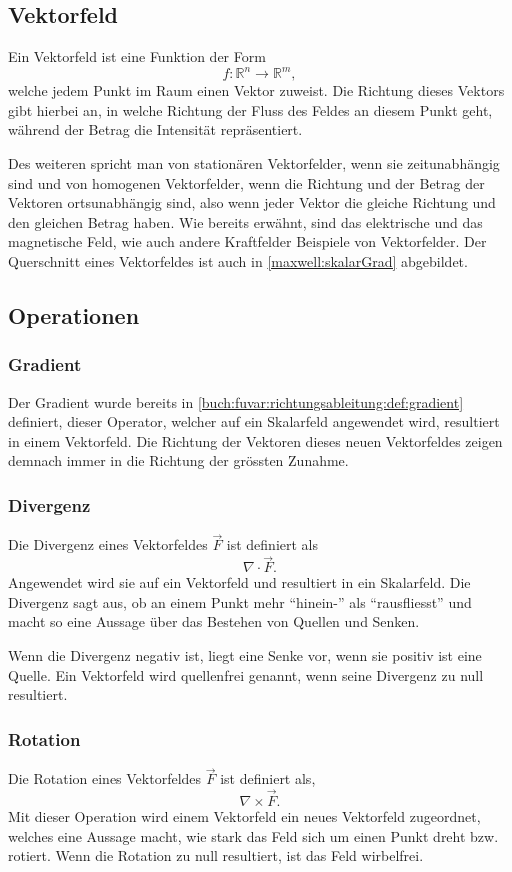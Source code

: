 \subsection{Vektorfeld\label{maxwell:vektorfeld}}

Ein Vektorfeld ist eine Funktion der Form \[ f: \mathbb{R}^n \rightarrow \mathbb{R}^m, \] welche jedem Punkt im Raum einen Vektor zuweist. 
Die Richtung dieses Vektors gibt hierbei an, in welche Richtung der Fluss des Feldes an diesem Punkt geht, während der Betrag die Intensität repräsentiert.


Des weiteren spricht man von stationären Vektorfelder, wenn sie zeitunabhängig sind und von homogenen Vektorfelder, wenn die Richtung und der Betrag der Vektoren ortsunabhängig sind, also wenn jeder Vektor die gleiche Richtung und den gleichen Betrag haben. 
Wie bereits erwähnt, sind das elektrische und das magnetische Feld, wie auch andere Kraftfelder Beispiele von Vektorfelder.
Der Querschnitt eines Vektorfeldes ist auch in \ref{maxwell:skalarGrad} abgebildet.

\subsection{Operationen}

\subsubsection{Gradient}

Der Gradient wurde bereits in \ref{buch:fuvar:richtungsableitung:def:gradient} definiert, dieser Operator, welcher auf ein Skalarfeld angewendet wird, resultiert in einem Vektorfeld. 
Die Richtung der Vektoren dieses neuen Vektorfeldes zeigen demnach immer in die Richtung der grössten Zunahme.

\subsubsection{Divergenz}
Die Divergenz eines Vektorfeldes $\vec{F}$ ist definiert als 
\[ \nabla\cdot\vec{F}. \]
Angewendet wird sie auf ein Vektorfeld und resultiert in ein Skalarfeld.
Die Divergenz sagt aus, ob an einem Punkt mehr ``hinein-'' als ``rausfliesst'' und macht so eine Aussage über das Bestehen von Quellen und Senken.

Wenn die Divergenz negativ ist, liegt eine Senke vor, wenn sie positiv ist eine Quelle.
Ein Vektorfeld wird quellenfrei genannt, wenn seine Divergenz zu null resultiert.

\subsubsection{Rotation}
Die Rotation eines Vektorfeldes $\vec{F}$ ist definiert als,
\[ \nabla\times\vec{F}. \]
Mit dieser Operation wird einem Vektorfeld ein neues Vektorfeld zugeordnet, welches eine Aussage macht, wie stark das Feld sich um einen Punkt dreht bzw. rotiert.
Wenn die Rotation zu null resultiert, ist das Feld wirbelfrei.
